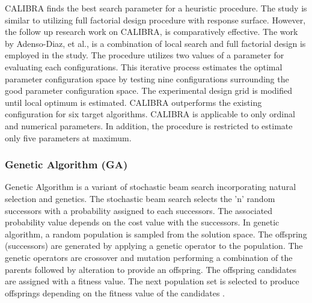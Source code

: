 
CALIBRA finds the best search parameter for a heuristic procedure. The study is similar to \cite{Coy_2001} utilizing full factorial design procedure with response surface. However, the follow up research work on CALIBRA, \cite{Adenso-Diaz_2006} is comparatively effective. The work by Adenso-Diaz, et al., \cite{Adenso-Diaz_2006} is a combination of local search and full factorial design is employed in the study. The procedure utilizes two values of a parameter for evaluating each configurations. This iterative process estimates the optimal parameter configuration space by testing nine configurations surrounding the good parameter configuration space. The experimental design grid is modified until local optimum is estimated. CALIBRA outperforms the existing configuration for six target algorithms. CALIBRA is applicable to only ordinal and numerical parameters. In addition, the procedure is restricted to estimate only five parameters at maximum.

\subsubsection{Genetic Algorithm (GA)}

Genetic Algorithm is a variant of stochastic beam search incorporating natural selection and genetics. The stochastic beam search selects the 'n' random successors with a probability assigned to each successors. The associated probability value depends on the cost value with the successors. In genetic algorithm, a random population is sampled from the solution space. The offspring (successors) are generated by applying a genetic operator to the population. The genetic operators are crossover and mutation performing a combination of the parents followed by alteration to provide an offspring. The offspring candidates are assigned with a fitness value. The next population set is selected to produce offsprings depending on the fitness value of the candidates \cite{Russell_Norvig}.

